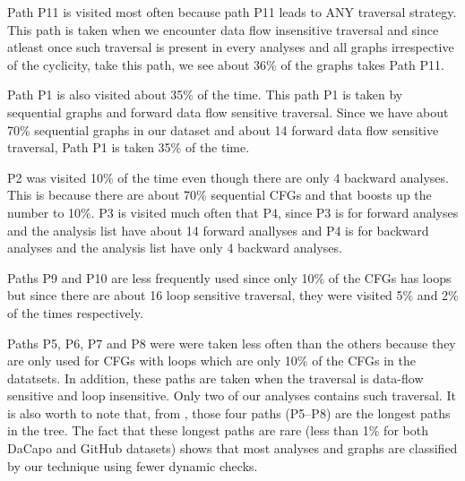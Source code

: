 Path P11 is visited most often because path P11 leads to ANY traversal strategy. This path is taken when we encounter data flow insensitive traversal and since atleast once such traversal is present in every analyses and all graphs irrespective of the cyclicity, take this path, we see about 36\% of the graphs takes Path P11. 

Path P1 is also visited about 35\% of the time. This path P1 is taken by sequential graphs and forward data flow sensitive traversal. Since we have about 70\% sequential graphs in our dataset and about 14 forward data flow sensitive traversal, Path P1 is taken 35\% of the time. 

P2 was visited 10\% of the time even though there are only 4 backward analyses. This is because there are about 70\% sequential CFGs and that boosts up the number to 10\%. 
P3 is visited much often that P4, since P3 is for forward analyses and the analysis list have about 14 forward anallyses and P4 is for backward analyses and the analysis list have only 4 backward analyses. 

Paths P9 and P10 are less frequently used since only 10\% of the CFGs has loops but since there are about 16 loop sensitive traversal, they were visited 5\% and 2\% of the times respectively. 

Paths P5, P6, 
P7 and P8 were were taken less often than the others because they are only 
used for CFGs with loops which are only 10\% of the CFGs in the datatsets.
In addition, these paths are taken when the traversal is data-flow sensitive 
and loop insensitive. Only two of our analyses contains such traversal.
%
It is also worth to note that, from , those four paths 
(P5--P8) are the longest paths in the tree. The fact that these longest paths 
are rare (less than 1\% for both DaCapo and GitHub datasets) shows that 
most analyses and graphs are classified by our technique using fewer dynamic 
checks.

